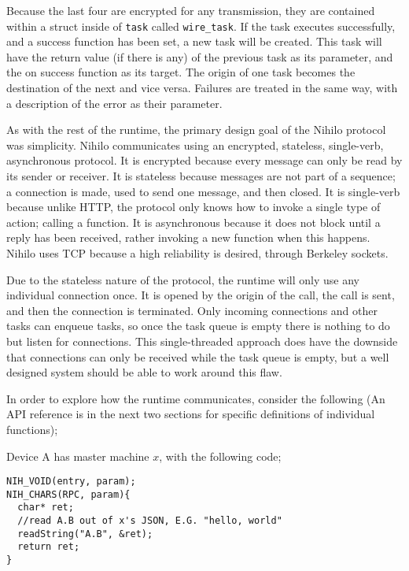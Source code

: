 \documentclass{article}
\begin{document}
Because the last four are encrypted for any transmission, they are contained within a struct inside of \texttt{task} called \texttt{wire\_task}. If the task executes successfully, and a success function has been set, a new task will be created. This task will have the return value (if there is any) of the previous task as its parameter, and the on success function as its target. The origin of one task becomes the destination of the next and vice versa.  Failures are treated in the same way, with a description of the error as their parameter.

As with the rest of the runtime, the primary design goal of the Nihilo protocol was simplicity. Nihilo communicates using an encrypted, stateless, single-verb, asynchronous protocol. It is encrypted because every message can only be read by its sender or receiver. It is stateless because messages are not part of a sequence; a connection is made, used to send one message, and then closed. It is single-verb because unlike HTTP, the protocol only knows how to invoke a single type of action; calling a function. It is asynchronous because it does not block until a reply has been received, rather invoking a new function when this happens. Nihilo uses TCP because a high reliability is desired, through Berkeley sockets.

Due to the stateless nature of the protocol, the runtime will only use any individual connection once. It is opened by the origin of the call, the call is sent, and then the connection is terminated. Only incoming connections and other tasks can enqueue tasks, so once the task queue is empty there is nothing to do but listen for connections. This single-threaded approach does have the downside that connections can only be received while the task queue is empty, but a well designed system should be able to work around this flaw.

In order to explore how the runtime communicates, consider the following (An API reference is in the next two sections for specific definitions of individual functions);

Device A has master machine \( x \), with the following code;
\begin{tcolorbox}[colback=white,grow to left by=2.5mm,grow to right by=2.5mm,left*=0mm,right*=0mm,sharp corners]
\begin{verbatim}
NIH_VOID(entry, param);
NIH_CHARS(RPC, param){
  char* ret;
  //read A.B out of x's JSON, E.G. "hello, world"
  readString("A.B", &ret);
  return ret;
}
\end{verbatim}
\end{tcolorbox}
\end{document}
